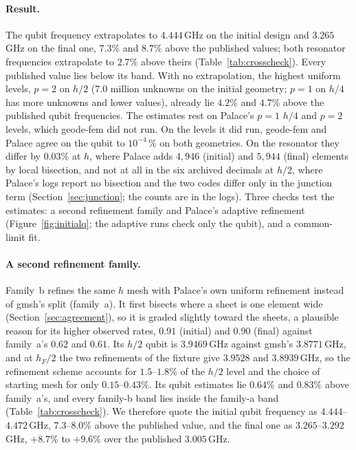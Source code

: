 \documentclass{anvil-paper}
\begin{document}
\paragraph{Result.}
The qubit frequency extrapolates to $4.444$\,GHz on the initial design
and $3.265$\,GHz on the final one, $7.3\%$ and $8.7\%$ above the
published values; both resonator frequencies extrapolate to $2.7\%$ above
theirs
(Table~\ref{tab:crosscheck}). Every published value lies below its band.
With no extrapolation, the
highest uniform levels, $p = 2$ on $h/2$ ($7.0$ million unknowns on the
initial geometry; $p = 1$ on $h/4$ has more unknowns and lower values),
already lie $4.2\%$ and $4.7\%$ above the published qubit frequencies. The
estimates rest on Palace's $p = 1$ $h/4$ and $p = 2$ levels, which
geode-fem did not run. On the levels it did run, geode-fem and Palace
agree on the qubit to $10^{-4}\,\%$ on both geometries. On the resonator
they differ by $0.03\%$ at $h$, where Palace adds $4{,}946$ (initial) and
$5{,}944$ (final) elements by local bisection, and not at all in the six
archived decimals at $h/2$, where Palace's logs report no bisection and
the two codes differ only in the junction term
(Section~\ref{sec:junction}; the counts are in the logs). Three checks
test the estimates: a second refinement family and Palace's adaptive
refinement (Figure~\ref{fig:initialq}; the adaptive runs check only the
qubit), and a common-limit fit.

\paragraph{A second refinement family.}
Family~b refines the same $h$ mesh with Palace's own uniform refinement
instead of gmsh's split (family~a). It first bisects where a sheet is one
element wide (Section~\ref{sec:agreement}), so it is graded slightly
toward the sheets, a plausible reason for its higher observed rates,
$0.91$ (initial) and $0.90$ (final) against family~a's $0.62$ and $0.61$.
Its $h/2$ qubit is $3.9469$\,GHz against gmsh's $3.8771$\,GHz, and at
$h_F/2$ the two refinements of the fixture give $3.9528$ and $3.8939$\,GHz, so the
refinement scheme accounts for $1.5$--$1.8\%$ of the $h/2$ level and the
choice of starting mesh for only $0.15$--$0.43\%$. Its qubit estimates lie
$0.64\%$ and $0.83\%$ above family~a's, and every family-b band lies
inside the family-a band (Table~\ref{tab:crosscheck}). We therefore quote
the initial qubit frequency as $4.444$--$4.472$\,GHz, $7.3$--$8.0\%$ above the
published value, and the final one as $3.265$--$3.292$\,GHz, $+8.7\%$ to
$+9.6\%$ over the published $3.005$\,GHz.
\end{document}
